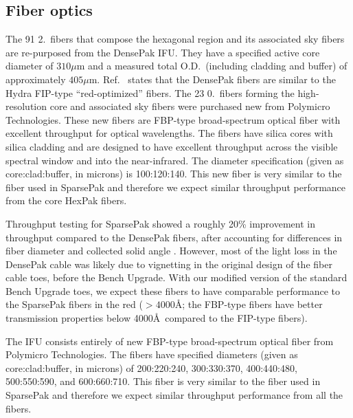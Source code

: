 \subsection{Fiber optics}
\label{GPBsub:sec:fibers}
The 91 2.\ fibers that compose the hexagonal region and its associated
sky fibers are re-purposed from the DensePak IFU.  They have a specified
active core diameter of $310\mu$m and a measured total O.D.\ (including
cladding and buffer) of approximately $405\mu$m.  Ref.~
states that the DensePak fibers are similar to the Hydra FIP-type
``red-optimized'' fibers.  The 23 0.\ fibers forming the
high-resolution core and associated sky fibers were purchased new from
Polymicro Technologies.  These new fibers are FBP-type broad-spectrum optical
fiber with excellent throughput for optical wavelengths.  The fibers have
silica cores with silica cladding and are designed to have excellent
throughput across the visible spectral window and into the near-infrared.  The
diameter specification (given as core:clad:buffer, in microns) is 100:120:140.
This new fiber is very similar to the fiber used in SparsePak and therefore we
expect similar throughput performance from the core HexPak fibers.

Throughput testing for SparsePak showed a roughly 20\% improvement in
throughput compared to the DensePak fibers, after accounting for differences
in fiber diameter and collected solid angle \citep{Bershady05}.  However, most
of the light loss in the DensePak cable was likely due to vignetting in the
original design of the fiber cable toes, before the Bench Upgrade.  With our
modified version of the standard Bench Upgrade toes, we expect these fibers to
have comparable performance to the SparsePak fibers in the red ($>4000$\AA;
the FBP-type fibers have better transmission properties below
4000\AA\ compared to the FIP-type fibers).

The \GP IFU consists entirely of new FBP-type broad-spectrum optical fiber
from Polymicro Technologies.  The fibers have specified diameters (given as
core:clad:buffer, in microns) of 200:220:240, 300:330:370, 400:440:480,
500:550:590, and 600:660:710.  This fiber is very similar to the fiber used in
SparsePak and therefore we expect similar throughput performance from all the
\GP fibers.


